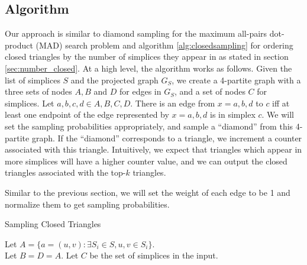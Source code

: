 \documentclass{article}
\begin{document}

\subsection{Algorithm}
Our approach is similar to diamond sampling for the maximum
all-pairs dot-product (MAD) search problem \cite{diamond} and
algorithm \ref{alg:closedsampling} for ordering closed
triangles by the number of simplices they appear in as stated
in section \ref{sec:number_closed}.
At a high level, the algorithm works as follows. Given the list
of simplices $S$ and the projected graph $G_S$, we create a 4-partite
graph with a three sets of nodes $A,B$ and $D$ for edges 
in $G_S$, and a set of nodes $C$ for simplices. Let
$a,b,c,d \in A,B,C,D$. There is an edge from $x = a,b,d$
to $c$ iff at least one endpoint of the edge represented by
$x = a,b,d$ is in simplex $c$.  We will set the sampling probabilities
appropriately, and sample a ``diamond'' from this 4-partite 
graph. If the ``diamond'' corresponds to a triangle, we
increment a counter associated with this triangle. Intuitively,
we expect that triangles which appear in more simplices will have
a higher counter value, and we can output the closed triangles
associated with the top-$k$ triangles.

Similar to the previous section, we will set the weight of each
edge to be 1 and normalize them to get sampling probabilities.

\begin{algorithm}\label{alg:allsampling}
  \caption{Sampling Closed Triangles}
  Let $A = \{a = (u,v) : \exists S_i \in S, u,v \in S_i \}$.\\
  Let $B = D = A$.
  Let $C$ be the set of simplices in the input.\\
\end{algorithm}
\end{document}
